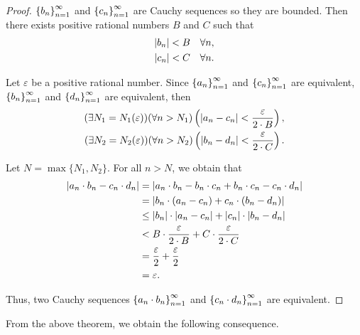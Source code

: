 \begin{proof}
    ${\left\{{b_{n}}\right\}}^{\infty}_{n=1}$  and ${\left\{{c_{n}}\right\}}^{\infty}_{n=1}$ are Cauchy sequences so they are bounded. Then there exists positive rational numbers $B$ and $C$ such that
    \[
        \begin{split}
            \left\vert{b_{n}}\right\vert < B\quad\forall n, \\
            \left\vert{c_{n}}\right\vert < C\quad\forall n.
        \end{split}
    \]

    Let $\varepsilon$ be a positive rational number. Since ${\left\{{a_{n}}\right\}}^{\infty}_{n=1}$ and ${\left\{{c_{n}}\right\}}^{\infty}_{n=1}$ are equivalent, ${\left\{{b_{n}}\right\}}^{\infty}_{n=1}$ and ${\left\{{d_{n}}\right\}}^{\infty}_{n=1}$ are equivalent, then
    \[
        \begin{split}
            (\exists N_{1}=N_{1}(\varepsilon))(\forall n > N_{1})\left(\left\vert{a_{n} - c_{n}}\right\vert < \frac{\varepsilon}{2\cdot B}\right), \\
            (\exists N_{2}=N_{2}(\varepsilon))(\forall n > N_{2})\left(\left\vert{b_{n} - d_{n}}\right\vert < \frac{\varepsilon}{2\cdot C}\right).
        \end{split}
    \]

    Let $N = \max\{ N_{1}, N_{2} \}$. For all $n > N$, we obtain that
    \begin{align*}
        \left\vert{a_{n}\cdot b_{n} - c_{n}\cdot d_{n}}\right\vert & = \left\vert{a_{n}\cdot b_{n} - b_{n}\cdot c_{n} + b_{n}\cdot c_{n} - c_{n}\cdot d_{n}}\right\vert \\
                                                  & = \left\vert{b_{n}\cdot (a_{n} - c_{n}) + c_{n}\cdot (b_{n} - d_{n})}\right\vert                   \\
                                                  & \le \left\vert{b_{n}}\right\vert\cdot\left\vert{a_{n} - c_{n}}\right\vert + \left\vert{c_{n}}\right\vert\cdot\left\vert{b_{n} - d_{n}}\right\vert     \\
                                                  & < B\cdot\frac{\varepsilon}{2\cdot B} + C\cdot\frac{\varepsilon}{2\cdot C}         \\
                                                  & = \frac{\varepsilon}{2} + \frac{\varepsilon}{2}                                   \\
                                                  & = \varepsilon.
    \end{align*}

    Thus, two Cauchy sequences ${\left\{{a_{n}\cdot b_{n}}\right\}}^{\infty}_{n=1}$ and ${\left\{{c_{n}\cdot d_{n}}\right\}}^{\infty}_{n=1}$ are equivalent.
\end{proof}

From the above theorem, we obtain the following consequence.

